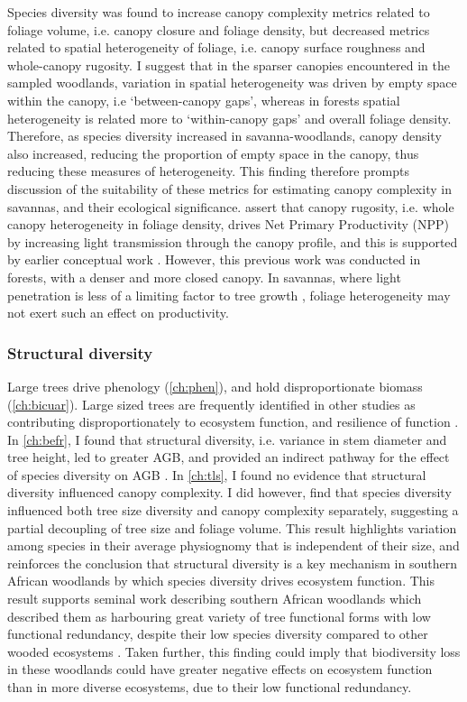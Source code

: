 \begin{refsection}
Species diversity was found to increase canopy complexity metrics related to foliage volume, i.e. canopy closure and foliage density, but decreased metrics related to spatial heterogeneity of foliage, i.e. canopy surface roughness and whole-canopy rugosity. I suggest that in the sparser canopies encountered in the sampled woodlands, variation in spatial heterogeneity was driven by empty space within the canopy, i.e `between-canopy gaps', whereas in forests spatial heterogeneity is related more to `within-canopy gaps' and overall foliage density. Therefore, as species diversity increased in savanna-woodlands, canopy density also increased, reducing the proportion of empty space in the canopy, thus reducing these measures of heterogeneity. This finding therefore prompts discussion of the suitability of these metrics for estimating canopy complexity in savannas, and their ecological significance. \citet{Hardiman2011} assert that canopy rugosity, i.e. whole canopy heterogeneity in foliage density, drives Net Primary Productivity (NPP) by increasing light transmission through the canopy profile, and this is supported by earlier conceptual work \citep{Horn1971}. However, this previous work was conducted in forests, with a denser and more closed canopy. In savannas, where light penetration is less of a limiting factor to tree growth \citep{Frost1996}, foliage heterogeneity may not exert such an effect on productivity. 

\subsubsection{Structural diversity}
\label{discussion:sssec:struc}

Large trees drive phenology (\autoref{ch:phen}), and hold disproportionate biomass (\autoref{ch:bicuar}). Large sized trees are frequently identified in other studies as contributing disproportionately to ecosystem function, and resilience of function \citep{Ali2021}. In \autoref{ch:befr}, I found that structural diversity, i.e. variance in stem diameter and tree height, led to greater AGB, and provided an indirect pathway for the effect of species diversity on AGB \citep{Ali2016, Pedro2017}. In \autoref{ch:tls}, I found no evidence that structural diversity influenced canopy complexity. I did however, find that species diversity influenced both tree size diversity and canopy complexity separately, suggesting a partial decoupling of tree size and foliage volume. This result highlights variation among species in their average physiognomy that is independent of their size, and reinforces the conclusion that structural diversity is a key mechanism in southern African woodlands by which species diversity drives ecosystem function. This result supports seminal work describing southern African woodlands which described them as harbouring great variety of tree functional forms with low functional redundancy, despite their low species diversity compared to other wooded ecosystems \citep{Solbrig1996}. Taken further, this finding could imply that biodiversity loss in these woodlands could have greater negative effects on ecosystem function than in more diverse ecosystems, due to their low functional redundancy.


\end{refsection}
